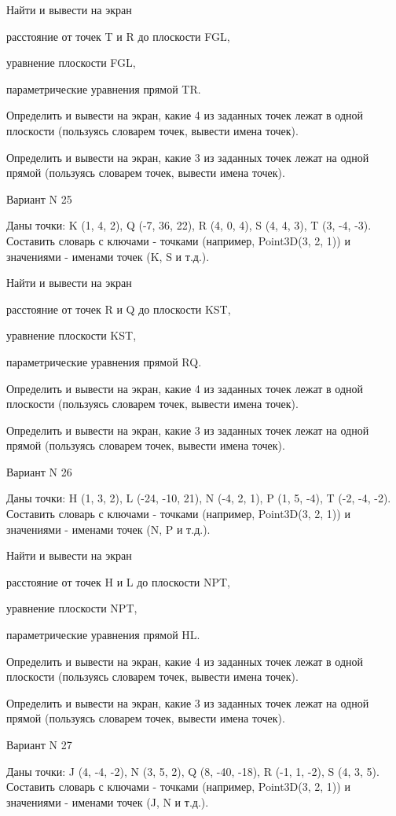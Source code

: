 \documentclass[11pt]{report}
\begin{document}
Найти и вывести на экран


расстояние от точек T и R до плоскости FGL,


уравнение плоскости FGL,


параметрические уравнения прямой TR.


Определить и вывести на экран, какие 4 из заданных точек лежат в одной плоскости (пользуясь словарем точек, вывести имена точек).


Определить и вывести на экран, какие 3 из заданных точек лежат на одной прямой (пользуясь словарем точек, вывести имена точек).

\newpage
Вариант N 25

Даны точки: K (1, 4, 2), Q (-7, 36, 22), R (4, 0, 4), S (4, 4, 3), T (3, -4, -3).
Составить словарь с ключами - точками (например, Point3D(3, 2, 1)) и значениями - именами точек (K, S и т.д.).


Найти и вывести на экран


расстояние от точек R и Q до плоскости KST,


уравнение плоскости KST,


параметрические уравнения прямой RQ.


Определить и вывести на экран, какие 4 из заданных точек лежат в одной плоскости (пользуясь словарем точек, вывести имена точек).


Определить и вывести на экран, какие 3 из заданных точек лежат на одной прямой (пользуясь словарем точек, вывести имена точек).

\newpage
Вариант N 26

Даны точки: H (1, 3, 2), L (-24, -10, 21), N (-4, 2, 1), P (1, 5, -4), T (-2, -4, -2).
Составить словарь с ключами - точками (например, Point3D(3, 2, 1)) и значениями - именами точек (N, P и т.д.).


Найти и вывести на экран


расстояние от точек H и L до плоскости NPT,


уравнение плоскости NPT,


параметрические уравнения прямой HL.


Определить и вывести на экран, какие 4 из заданных точек лежат в одной плоскости (пользуясь словарем точек, вывести имена точек).


Определить и вывести на экран, какие 3 из заданных точек лежат на одной прямой (пользуясь словарем точек, вывести имена точек).

\newpage
Вариант N 27

Даны точки: J (4, -4, -2), N (3, 5, 2), Q (8, -40, -18), R (-1, 1, -2), S (4, 3, 5).
Составить словарь с ключами - точками (например, Point3D(3, 2, 1)) и значениями - именами точек (J, N и т.д.).
\end{document}
